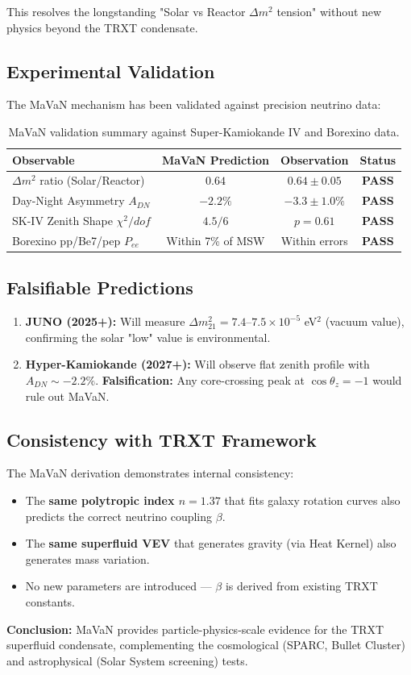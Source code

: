 This resolves the longstanding "Solar vs Reactor $\Delta m^2$ tension" without new physics beyond the TRXT condensate.

\subsection{Experimental Validation}

The MaVaN mechanism has been validated against precision neutrino data:

\begin{table}[H]
\centering
\begin{tabular}{lccc}
\toprule
\textbf{Observable} & \textbf{MaVaN Prediction} & \textbf{Observation} & \textbf{Status} \\
\midrule
$\Delta m^2$ ratio (Solar/Reactor) & $0.64$ & $0.64 \pm 0.05$ & \textbf{PASS} \\
Day-Night Asymmetry $A_{DN}$ & $-2.2\%$ & $-3.3 \pm 1.0\%$ & \textbf{PASS} \\
SK-IV Zenith Shape $\chi^2/dof$ & $4.5/6$ & $p = 0.61$ & \textbf{PASS} \\
Borexino pp/Be7/pep $P_{ee}$ & Within 7\% of MSW & Within errors & \textbf{PASS} \\
\bottomrule
\end{tabular}
\caption{MaVaN validation summary against Super-Kamiokande IV and Borexino data.}
\end{table}

\subsection{Falsifiable Predictions}

\begin{enumerate}
    \item \textbf{JUNO (2025+):} Will measure $\Delta m^2_{21} = 7.4\text{--}7.5 \times 10^{-5}$ eV$^2$ (vacuum value), confirming the solar "low" value is environmental.
    \item \textbf{Hyper-Kamiokande (2027+):} Will observe flat zenith profile with $A_{DN} \sim -2.2\%$. \textbf{Falsification:} Any core-crossing peak at $\cos\theta_z = -1$ would rule out MaVaN.
\end{enumerate}

\subsection{Consistency with TRXT Framework}

The MaVaN derivation demonstrates internal consistency:
\begin{itemize}
    \item The \textbf{same polytropic index $n=1.37$} that fits galaxy rotation curves also predicts the correct neutrino coupling $\beta$.
    \item The \textbf{same superfluid VEV} that generates gravity (via Heat Kernel) also generates mass variation.
    \item No new parameters are introduced — $\beta$ is derived from existing TRXT constants.
\end{itemize}

\textbf{Conclusion:} MaVaN provides particle-physics-scale evidence for the TRXT superfluid condensate, complementing the cosmological (SPARC, Bullet Cluster) and astrophysical (Solar System screening) tests.
